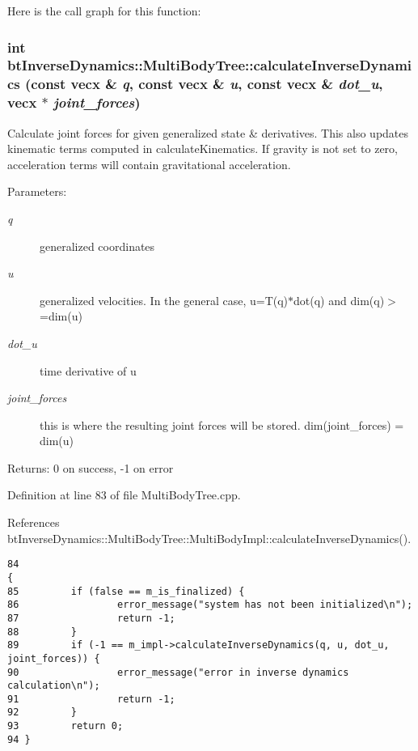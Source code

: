 Here is the call graph for this function:\hypertarget{classbt_inverse_dynamics_1_1_multi_body_tree_20e281422ee7504a25357275c08d5690}{
\subsubsection[calculateInverseDynamics]{\setlength{\rightskip}{0pt plus 5cm}int btInverseDynamics::MultiBodyTree::calculateInverseDynamics (const vecx \& {\em q}, \/  const vecx \& {\em u}, \/  const vecx \& {\em dot\_\-u}, \/  vecx $\ast$ {\em joint\_\-forces})}}
\label{classbt_inverse_dynamics_1_1_multi_body_tree_20e281422ee7504a25357275c08d5690}


Calculate joint forces for given generalized state \& derivatives. This also updates kinematic terms computed in calculateKinematics. If gravity is not set to zero, acceleration terms will contain gravitational acceleration. \begin{Desc}
\item[Parameters:]
\begin{description}
\item[{\em q}]generalized coordinates \item[{\em u}]generalized velocities. In the general case, u=T(q)$\ast$dot(q) and dim(q)$>$=dim(u) \item[{\em dot\_\-u}]time derivative of u \item[{\em joint\_\-forces}]this is where the resulting joint forces will be stored. dim(joint\_\-forces) = dim(u) \end{description}
\end{Desc}
\begin{Desc}
\item[Returns:]0 on success, -1 on error \end{Desc}


Definition at line 83 of file MultiBodyTree.cpp.

References btInverseDynamics::MultiBodyTree::MultiBodyImpl::calculateInverseDynamics().

\begin{Code}\begin{verbatim}84                                                                                                             {
85         if (false == m_is_finalized) {
86                 error_message("system has not been initialized\n");
87                 return -1;
88         }
89         if (-1 == m_impl->calculateInverseDynamics(q, u, dot_u, joint_forces)) {
90                 error_message("error in inverse dynamics calculation\n");
91                 return -1;
92         }
93         return 0;
94 }
\end{verbatim}
\end{Code}




